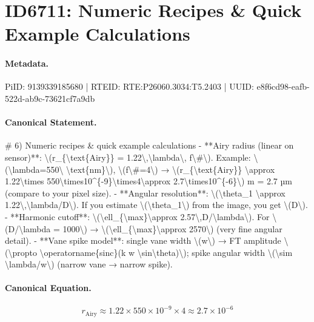 \section*{ID6711: Numeric Recipes \& Quick Example Calculations}
\paragraph{Metadata.}
PiID: 9139339185680 | RTEID: RTE:P26060.3034:T5.2403 | UUID: e8f6cd98-eafb-522d-ab9c-73621cf7a9db

\paragraph{Canonical Statement.}
\# 6) Numeric recipes \& quick example calculations - **Airy radius (linear on sensor)**: \textbackslash{}(r\_\{\textbackslash{}text\{Airy\}\} = 1.22\textbackslash{},\textbackslash{}lambda\textbackslash{}, f\textbackslash{}\#\textbackslash{}). Example: \textbackslash{}(\textbackslash{}lambda=550\textbackslash{} \textbackslash{}text\{nm\}\textbackslash{}), \textbackslash{}(f\textbackslash{}\#=4\textbackslash{}) → \textbackslash{}(r\_\{\textbackslash{}text\{Airy\}\} \textbackslash{}approx 1.22\textbackslash{}times 550\textbackslash{}times10\textasciicircum{}\{-9\}\textbackslash{}times4\textbackslash{}approx 2.7\textbackslash{}times10\textasciicircum{}\{-6\}\textbackslash{}) m = 2.7 µm (compare to your pixel size). - **Angular resolution**: \textbackslash{}(\textbackslash{}theta\_1 \textbackslash{}approx 1.22\textbackslash{},\textbackslash{}lambda/D\textbackslash{}). If you estimate \textbackslash{}(\textbackslash{}theta\_1\textbackslash{}) from the image, you get \textbackslash{}(D\textbackslash{}). - **Harmonic cutoff**: \textbackslash{}(\textbackslash{}ell\_\{\textbackslash{}max\}\textbackslash{}approx 2.57\textbackslash{},D/\textbackslash{}lambda\textbackslash{}). For \textbackslash{}(D/\textbackslash{}lambda = 1000\textbackslash{}) → \textbackslash{}(\textbackslash{}ell\_\{\textbackslash{}max\}\textbackslash{}approx 2570\textbackslash{}) (very fine angular detail). - **Vane spike model**: single vane width \textbackslash{}(w\textbackslash{}) → FT amplitude \textbackslash{}(\textbackslash{}propto \textbackslash{}operatorname\{sinc\}(k w \textbackslash{}sin\textbackslash{}theta)\textbackslash{}); spike angular width \textbackslash{}(\textbackslash{}sim \textbackslash{}lambda/w\textbackslash{}) (narrow vane → narrow spike).

\paragraph{Canonical Equation.}
\[
r_{\text{Airy}} \approx 1.22\times 550\times10^{-9}\times4\approx 2.7\times10^{-6}
\]

